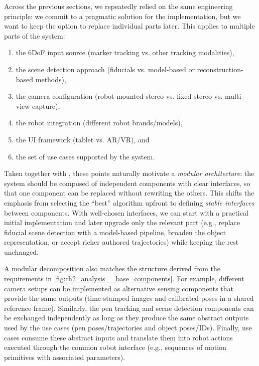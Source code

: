 Across the previous sections, we repeatedly relied on the same engineering principle: we commit to a pragmatic solution for the implementation, but we want to keep the option to replace individual parts later. This applies to multiple parts of the system:
\begin{enumerate}[label=(\roman*), itemsep=0.2em]
    \item the 6DoF input source (marker tracking vs. other tracking modalities),
    \item the scene detection approach (fiducials vs. model-based or reconstruction-based methods),
    \item the camera configuration (robot-mounted stereo vs. fixed stereo vs. multi-view capture),
    \item the robot integration (different robot brands/models),
    \item the UI framework (tablet vs. AR/VR), and
    \item the set of use cases supported by the system.
\end{enumerate}

Taken together with , these points naturally motivate a \emph{modular architecture}: the system should be composed of independent components with clear interfaces, so that one component can be replaced without rewriting the others. This shifts the emphasis from selecting the “best” algorithm upfront to defining \emph{stable interfaces} between components. With well-chosen interfaces, we can start with a practical initial implementation and later upgrade only the relevant part (e.g., replace fiducial scene detection with a model-based pipeline, broaden the object representation, or accept richer authored trajectories) while keeping the rest unchanged.

A modular decomposition also matches the structure derived from the requirements in \autoref{fig:ch2_analysis__base_components}. For example, different camera setups can be implemented as alternative sensing components that provide the same outputs (time-stamped images and calibrated poses in a shared reference frame). Similarly, the pen tracking and scene detection components can be exchanged independently as long as they produce the same abstract outputs used by the use cases (pen poses/trajectories and object poses/IDs). Finally, use cases consume these abstract inputs and translate them into robot actions executed through the common robot interface (e.g., sequences of motion primitives with associated parameters).

